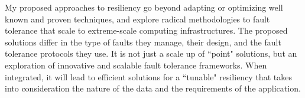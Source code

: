 My proposed approaches to resiliency go beyond adapting or optimizing well known and proven techniques, and explore radical methodologies to fault tolerance that scale to extreme-scale computing infrastructures. The proposed solutions differ in the type of faults they manage, their design, and the fault tolerance protocols they use. It is not just a scale up of  ``point" solutions, but an exploration of innovative and scalable fault tolerance frameworks. When integrated, it will lead to efficient solutions for a ``tunable" resiliency that takes into consideration the nature of the data and the requirements of the application.

